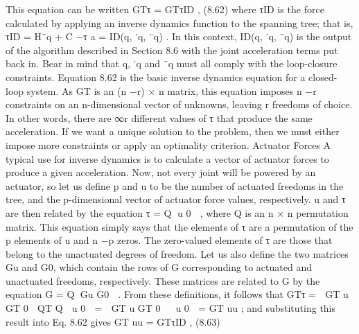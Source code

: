 This equation can be written GTτ = GTτID , (8.62) where τID is the force calculated by applying an inverse dynamics function to the spanning tree; that is, τID = H¨q + C −τ a = ID(q, ˙q, ¨q) . In this context, ID(q, ˙q, ¨q) is the output of the algorithm described in Section 8.6 with the joint acceleration terms put back in. Bear in mind that q, ˙q and ¨q must all comply with the loop-closure constraints. Equation 8.62 is the basic inverse dynamics equation for a closed-loop system. As GT is an (n −r) × n matrix, this equation imposes n −r constraints on an n-dimensional vector of unknowns, leaving r freedoms of choice. In other words, there are ∞r different values of τ that produce the same acceleration. If we want a unique solution to the problem, then we must either impose more constraints or apply an optimality criterion. Actuator Forces A typical use for inverse dynamics is to calculate a vector of actuator forces to produce a given acceleration. Now, not every joint will be powered by an actuator, so let us define p and u to be the number of actuated freedoms in the tree, and the p-dimensional vector of actuator force values, respectively. u and τ are then related by the equation τ = Q u 0  , where Q is an n × n permutation matrix. This equation simply says that the elements of τ are a permutation of the p elements of u and n −p zeros. The zero-valued elements of τ are those that belong to the unactuated degrees of freedom. Let us also define the two matrices Gu and G0, which contain the rows of G corresponding to actuated and unactuated freedoms, respectively. These matrices are related to G by the equation G = Q Gu G0  . From these definitions, it follows that GTτ =  GT u GT 0  QT Q  u 0  =  GT u GT 0   u 0  = GT uu ; and substituting this result into Eq. 8.62 gives GT uu = GTτID , (8.63)

